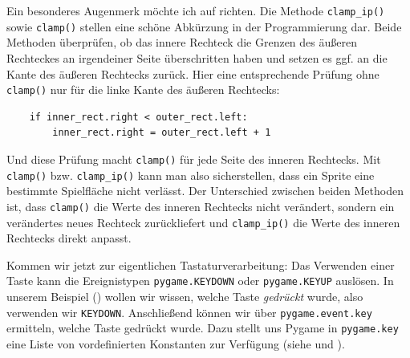 Ein besonderes Augenmerk möchte ich auf  richten. Die Methode \texttt{clamp\_ip()} sowie \texttt{clamp()} stellen eine schöne Abkürzung in der Programmierung dar. Beide Methoden überprüfen, ob das innere Rechteck die Grenzen des äußeren Rechteckes an irgendeiner Seite überschritten haben und setzen es ggf. an die Kante des äußeren Rechtecks zurück. Hier eine entsprechende Prüfung ohne \texttt{clamp()} nur für die linke Kante des äußeren Rechtecks:
\lstset{firstnumber=1}
\begin{lstlisting}
	if inner_rect.right < outer_rect.left:
		inner_rect.right = outer_rect.left + 1
\end{lstlisting}
Und diese Prüfung macht \texttt{clamp()} für jede Seite des inneren Rechtecks. Mit \texttt{clamp()} bzw. \texttt{clamp\_ip()} kann man also sicherstellen, dass ein Sprite eine bestimmte Spielfläche nicht verlässt. Der Unterschied zwischen beiden Methoden ist, dass \texttt{clamp()} die Werte des inneren Rechtecks nicht verändert, sondern ein verändertes neues Rechteck zurückliefert und \texttt{clamp\_ip()} die Werte des inneren Rechtecks direkt anpasst.




Kommen wir jetzt zur eigentlichen Tastaturverarbeitung: Das Verwenden einer Taste kann die Ereignistypen \texttt{pygame.KEYDOWN} oder \texttt{pygame.KEYUP} auslösen. In unserem Beispiel () wollen wir wissen, welche Taste \emph{gedrückt} wurde, also verwenden wir \texttt{KEYDOWN}. Anschließend können wir über \texttt{pygame.event.key} ermitteln, welche Taste gedrückt wurde. Dazu stellt uns Pygame in \texttt{pygame.key} eine Liste von vordefinierten Konstanten zur Verfügung (siehe  und ).

